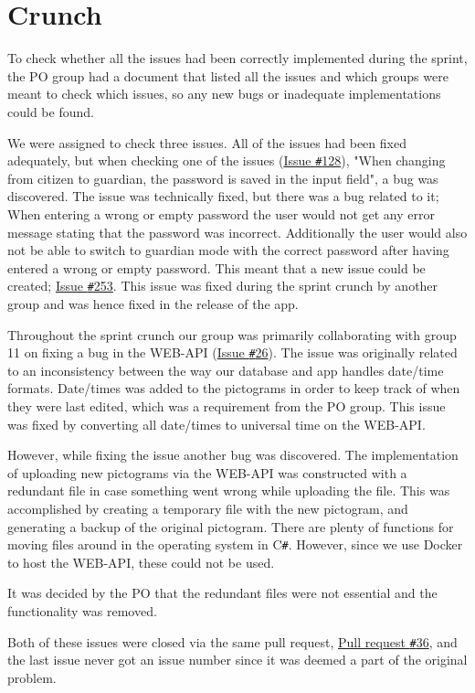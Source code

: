 \section{Crunch}
To check whether all the issues had been correctly implemented during the sprint, the PO group had a document that listed all the issues and which groups were meant to check which issues, so any new bugs or inadequate implementations could be found.

We were assigned to check three issues.
All of the issues had been fixed adequately, but when checking one of the issues (\href{https://github.com/aau-giraf/weekplanner/issues/128}{Issue \texttt{\#}128}), "When changing from citizen to guardian, the password is saved in the input field", a bug was discovered.
The issue was technically fixed, but there was a bug related to it; When entering a wrong or empty password the user would not get any error message stating that the password was incorrect.
Additionally the user would also not be able to switch to guardian mode with the correct password after having entered a wrong or empty password.
This meant that a new issue could be created; \href{https://github.com/aau-giraf/weekplanner/issues/253}{Issue \texttt{\#}253}.
This issue was fixed during the sprint crunch by another group and was hence fixed in the release of the app.

Throughout the sprint crunch our group was primarily collaborating with group 11 on fixing a bug in the WEB-API (\href{https://github.com/aau-giraf/web-api/issues/26}{Issue \texttt{\#}26}).
The issue was originally related to an inconsistency between the way our database and app handles date/time formats. 
Date/times was added to the pictograms in order to keep track of when they were last edited, which was a requirement from the PO group. 
This issue was fixed by converting all date/times to universal time on the WEB-API. 

However, while fixing the issue another bug was discovered.
The implementation of uploading new pictograms via the WEB-API was constructed with a redundant file in case something went wrong while uploading the file. 
This was accomplished by creating a temporary file with the new pictogram, and generating a backup of the original pictogram. 
There are plenty of functions for moving files around in the operating system in C\texttt{\#}. 
However, since we use Docker to host the WEB-API, these could not be used. 

It was decided by the PO that the redundant files were not essential and the functionality was removed.

Both of these issues were closed via the same pull request, \href{https://github.com/aau-giraf/web-api/pull/36}{Pull request \texttt{\#}36}, and the last issue never got an issue number since it was deemed a part of the original problem. 
